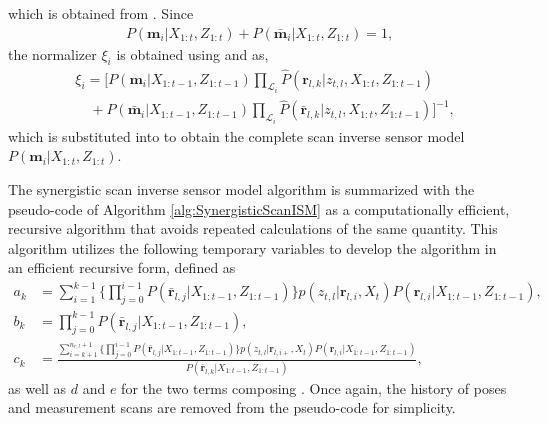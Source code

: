 which is obtained from . Since %
\begin{align*}
P(\mathbf{m}_i|X_{1:t},Z_{1:t})+P(\bar{\mathbf{m}}_i|X_{1:t},Z_{1:t})=1,
\end{align*}
the normalizer $\xi_i$ is obtained using  and  as,
\begin{align}
&\xi_i=
\bigg[
P(\mathbf{m}_i|{X_{1:t-1}},Z_{1:t-1})
\prod_{\mathcal L_i}
\hat P(\mathbf{r}_{l,k}|z_{t,l},{X_{1:t}},Z_{1:t-1})
\nonumber\\&\quad
+
P(\bar{\mathbf{m}}_i|{X_{1:t-1}},Z_{1:t-1})
\prod_{\mathcal L_i}
\hat P(\bar{\mathbf{r}}_{l,k}|z_{t,l},X_{1:t},Z_{1:t-1})
\bigg]^{-1},\label{eqn:xi}
\end{align}
which is substituted into  to obtain the complete scan inverse sensor model $P(\mathbf{m}_i|X_{1:t},Z_{1:t})$. 


The synergistic scan inverse sensor model algorithm is summarized with the pseudo-code of Algorithm \ref{alg:SynergisticScanISM} as a computationally efficient, recursive algorithm that avoids repeated calculations of the same quantity. This algorithm utilizes the following temporary variables to develop the algorithm in an efficient recursive form, defined as
\begin{align*}
a_k&=\sum_{i=1}^{k-1}\bigg\{\prod_{j=0}^{i-1}P(\bar{\mathbf{r}}_{l,j}|X_{1:t-1},Z_{1:t-1})\bigg\}p(z_{t,l}|\mathbf{r}_{l,i},X_t)P(\mathbf{r}_{l,i}|X_{1:t-1},Z_{1:t-1}),
\\
b_k&=\prod_{j=0}^{k-1}P(\bar{\mathbf{r}}_{l,j}|X_{1:t-1},Z_{1:t-1}),
\nonumber\\
c_k&=\frac{
\sum_{i=k+1}^{n_{r,l}+1}\bigg\{\prod_{j=0}^{i-1}P(\bar{\mathbf{r}}_{l,j}|X_{1:t-1},Z_{1:t-1})\bigg\}p(z_{t,l}|\mathbf{r}_{l,i+},X_t)P(\mathbf{r}_{l,i}|X_{1:t-1},Z_{1:t-1})}{P(\bar{\mathbf{r}}_{l,k}|X_{1:t-1},Z_{1:t-1})},
\end{align*}
as well as $d$ and $e$ for the two terms composing . Once again, the history of poses and measurement scans are removed from the pseudo-code for simplicity.


